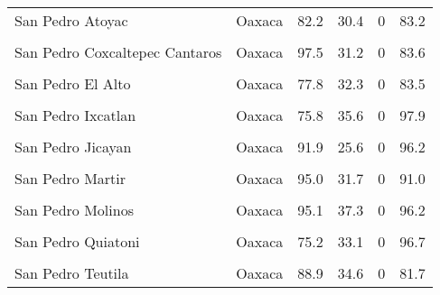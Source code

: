 \documentclass[
]{report}
\begin{document}
\begin{longtable}[t]{llrrrr}
San Pedro Atoyac & Oaxaca & 82.2 & 30.4 & 0 & 83.2\\
\cellcolor{gray!6}{San Pedro Cajonos} & \cellcolor{gray!6}{Oaxaca} & \cellcolor{gray!6}{97.9} & \cellcolor{gray!6}{44.2} & \cellcolor{gray!6}{0} & \cellcolor{gray!6}{98.6}\\
San Pedro Coxcaltepec Cantaros & Oaxaca & 97.5 & 31.2 & 0 & 83.6\\
\cellcolor{gray!6}{San Pedro Comitancillo} & \cellcolor{gray!6}{Oaxaca} & \cellcolor{gray!6}{97.6} & \cellcolor{gray!6}{44.1} & \cellcolor{gray!6}{0} & \cellcolor{gray!6}{70.2}\\
\addlinespace
San Pedro El Alto & Oaxaca & 77.8 & 32.3 & 0 & 83.5\\
\cellcolor{gray!6}{San Pedro Huilotepec} & \cellcolor{gray!6}{Oaxaca} & \cellcolor{gray!6}{90.6} & \cellcolor{gray!6}{46.1} & \cellcolor{gray!6}{0} & \cellcolor{gray!6}{91.0}\\
San Pedro Ixcatlan & Oaxaca & 75.8 & 35.6 & 0 & 97.9\\
\cellcolor{gray!6}{San Pedro Jaltepetongo} & \cellcolor{gray!6}{Oaxaca} & \cellcolor{gray!6}{92.0} & \cellcolor{gray!6}{32.7} & \cellcolor{gray!6}{0} & \cellcolor{gray!6}{97.4}\\
San Pedro Jicayan & Oaxaca & 91.9 & 25.6 & 0 & 96.2\\
\addlinespace
\cellcolor{gray!6}{San Pedro Jocotipac} & \cellcolor{gray!6}{Oaxaca} & \cellcolor{gray!6}{85.6} & \cellcolor{gray!6}{43.9} & \cellcolor{gray!6}{0} & \cellcolor{gray!6}{90.0}\\
San Pedro Martir & Oaxaca & 95.0 & 31.7 & 0 & 91.0\\
\cellcolor{gray!6}{San Pedro Martir Quiechapa} & \cellcolor{gray!6}{Oaxaca} & \cellcolor{gray!6}{100.0} & \cellcolor{gray!6}{25.2} & \cellcolor{gray!6}{0} & \cellcolor{gray!6}{56.0}\\
San Pedro Molinos & Oaxaca & 95.1 & 37.3 & 0 & 96.2\\
\cellcolor{gray!6}{San Pedro Ocotepec} & \cellcolor{gray!6}{Oaxaca} & \cellcolor{gray!6}{85.6} & \cellcolor{gray!6}{29.7} & \cellcolor{gray!6}{0} & \cellcolor{gray!6}{99.2}\\
\addlinespace
San Pedro Quiatoni & Oaxaca & 75.2 & 33.1 & 0 & 96.7\\
\cellcolor{gray!6}{San Pedro Sochiapam} & \cellcolor{gray!6}{Oaxaca} & \cellcolor{gray!6}{83.4} & \cellcolor{gray!6}{31.9} & \cellcolor{gray!6}{0} & \cellcolor{gray!6}{96.6}\\
San Pedro Teutila & Oaxaca & 88.9 & 34.6 & 0 & 81.7\\

\end{longtable}
\end{document}
